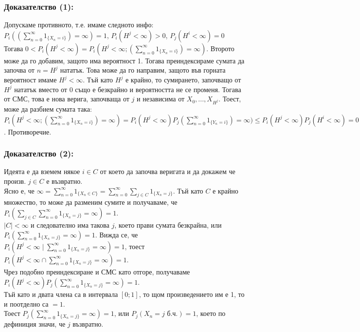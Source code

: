 \documentclass{article}
\begin{document}
\subsubsection*{Доказателство (1):}
Допускаме противното, т.е. имаме следното инфо: \\
$P_i\left(\left(\sum_{n=0}^\infty 1_{\{X_n = i\}}\right) = \infty\right) = 1$, $P_i(H^j < \infty) > 0$, $P_j(H^i < \infty) = 0$ \\
Тогава $0 < P_i(H^j < \infty) = P_i\left(H^j < \infty; \left(\sum_{n=0}^\infty 1_{\{X_n = i\}}\right) = \infty\right)$. Второто може да го добавим, 
защото има вероятност 1. Тогава преиндексираме сумата да започва от $n = H^j$ нататък. 
Това може да го направим, защото във горната вероятност имаме $H^j < \infty$. Тъй като $H^j$ е крайно, 
то сумирането, започващо от $H^j$ нататък вместо от 0 също е безкрайно и вероятността не се променя. 
Тогава от СМС, това е нова верига, започваща от $j$ и независима от $X_0,...,X_{H^j}$. Тоест, може да разбием сумата така: \\
$P_i\left(H^j < \infty; \left(\sum_{n=0}^\infty 1_{\{X_n = i\}}\right) = \infty\right) = P_i(H^j < \infty)P_j\left(\sum_{n=0}^\infty 1_{\{Y_n = i\}}\right) = \infty) \leq P_i(H^j < \infty)P_j(H^i < \infty) = 0$. Противоречие.

\subsubsection*{Доказателство (2):}
Идеята е да вземем някое $i \in C$ от което да започва веригата и да докажем че произв. $j \in C$ е възвратно. \\
Ясно е, че $\infty = \sum_{n=0}^\infty 1_{\{X_n \in C\}} = \sum_{n=0}^\infty \sum_{j \in C} 1_{\{X_n = j\}}$. Тъй като $C$ е крайно 
множество, то може да разменим сумите и получаваме, че \\ $P_i\left(\sum_{j \in C} \sum_{n=0}^\infty 1_{\{X_n = j\}} = \infty\right) = 1$. \\
$|C| < \infty$ и следователно има такова $j$, което прави сумата безкрайна, или $P_i\left(\sum_{n=0}^\infty 1_{\{X_n = j\}} = \infty\right) = 1$.
Вижда се, че \\ $P_i\left(H^j < \infty \mid \sum_{n=0}^\infty 1_{\{X_n = j\}} = \infty\right) = 1$, тоест \\ $P_i\left(H^j < \infty \cap \sum_{n=0}^\infty 1_{\{X_n = j\}} = \infty\right) = 1$. \\
Чрез подобно преиндексиране и СМС като отгоре, получаваме \\ $P_i(H^j < \infty)P_j\left(\sum_{n=0}^\infty 1_{\{X_n = j\}} = \infty\right) = 1$. \\
Тъй като и двата члена са в интервала $[0;1]$, то щом произведението им е 1, то и поотделно са $= 1$. \\
Тоест $P_j\left(\sum_{n=0}^\infty 1_{\{X_n = j\}} = \infty\right) = 1$, или $P_j(X_n = j \text{ б.ч.}) = 1$, което по дефиниция значи, че $j$ възвратно.
\end{document}
